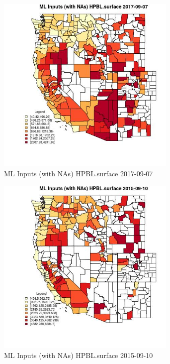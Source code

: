 \begin{figure} 
\centering  
\includegraphics[width=0.77\textwidth]{Code_Outputs/Report_ML_input_PM25_Step4_part_e_de_duplicated_aves_compiled_2019-05-21wNAs_CountyHPBLsurfaceMean2017-09-07.jpg} 
\caption{\label{fig:Report_ML_input_PM25_Step4_part_e_de_duplicated_aves_compiled_2019-05-21wNAsCountyHPBLsurfaceMean2017-09-07}ML Inputs (with NAs) HPBL.surface 2017-09-07} 
\end{figure} 
 

\begin{figure} 
\centering  
\includegraphics[width=0.77\textwidth]{Code_Outputs/Report_ML_input_PM25_Step4_part_e_de_duplicated_aves_compiled_2019-05-21wNAs_CountyHPBLsurfaceMean2015-09-10.jpg} 
\caption{\label{fig:Report_ML_input_PM25_Step4_part_e_de_duplicated_aves_compiled_2019-05-21wNAsCountyHPBLsurfaceMean2015-09-10}ML Inputs (with NAs) HPBL.surface 2015-09-10} 
\end{figure} 
 

